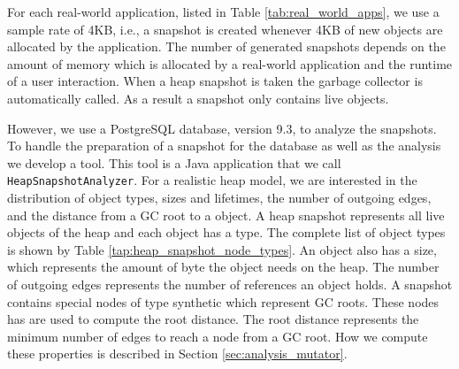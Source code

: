 For each real-world application, listed in Table \ref{tab:real_world_apps}, we use a sample rate of 4KB, i.e., a snapshot is created whenever 4KB of new objects are allocated by the application. The number of generated snapshots depends on the amount of memory which is allocated by a real-world application and the runtime of a user interaction. When a heap snapshot is taken the garbage collector is automatically called. As a result a snapshot only contains live objects. 

However, we use a PostgreSQL \cite{PSQL} database, version 9.3, to analyze the snapshots. To handle the preparation of a snapshot for the database as well as the analysis we develop a tool. This tool is a Java application that we call \texttt{HeapSnapshotAnalyzer}. For a realistic heap model, we are interested in the distribution of object types, sizes and lifetimes, the number of outgoing edges, and the distance from a GC root to a object. A heap snapshot represents all live objects of the \JS heap and each object has a type. The complete list of object types is shown by Table \ref{tap:heap_snapshot_node_types}. An object also has a size, which represents the amount of byte the object needs on the heap. The number of outgoing edges represents the number of references an object holds. A snapshot contains special nodes of type synthetic which represent GC roots. These nodes has are used to compute the root distance. The root distance represents the minimum number of edges to reach a node from a GC root. How we compute these properties is described in Section \ref{sec:analysis_mutator}.